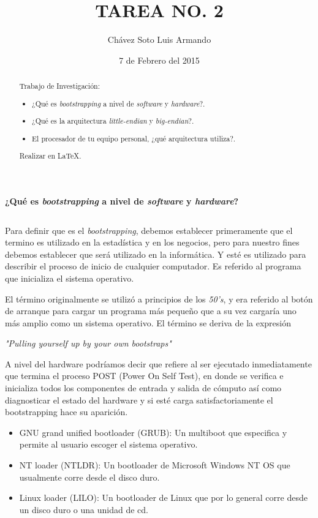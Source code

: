 \documentclass[11pt,a4paper]{article}
\author{Chávez Soto Luis Armando}
\title{TAREA NO. 2}
\date{7 de Febrero del 2015}
\begin{document}
	\maketitle

\begin{abstract}
Trabajo de Investigación:

	\begin{itemize}
		\item ¿Qué es \textit{bootstrapping} a nivel de \textit{software} y \textit{hardware}?.
		\item ¿Qué es la arquitectura \textit{little-endian} y\textit{ big-endian}?.
		\item El procesador de tu equipo personal, ¿qué arquitectura utiliza?.	
	\end{itemize}
	 Realizar en LaTeX. 
\end{abstract}


\textbf{¿Qué es \textit{bootstrapping} a nivel de \textit{software} y \textit{hardware}?}
 
 $ $
 
Para definir que es el \textit{bootstrapping}, debemos establecer primeramente que el termino es utilizado en la estadística y en los negocios, pero para nuestro fines debemos establecer que será utilizado en la informática. Y esté es utilizado para describir el proceso de inicio de cualquier computador. Es referido al programa que inicializa el sistema operativo.

El término originalmente se utilizó a principios de los \textit{50's}, y era referido al botón de arranque para cargar un programa más pequeño que a su vez cargaría uno más amplio como un sistema operativo. El término se deriva de la expresión \begin{center}\textit{ "Pulling yourself up by your own bootstraps"}\end{center}

A nivel del hardware podríamos decir que refiere al ser ejecutado inmediatamente que termina el proceso POST (Power On Self Test), en donde se verifica e inicializa todos los componentes de entrada y salida de cómputo así como diagnosticar el estado del hardware y si esté carga satisfactoriamente el bootstrapping hace su aparición.

\begin{itemize}
\item GNU grand unified bootloader (GRUB): Un multiboot que especifica y permite al usuario escoger el sistema operativo. 
\item NT loader (NTLDR): Un bootloader de Microsoft Windows NT OS que usualmente corre desde el disco duro.
\item Linux loader (LILO): Un bootloader de Linux que por lo general corre desde un disco duro o una unidad de cd. 
\end{itemize}
\end{document}
